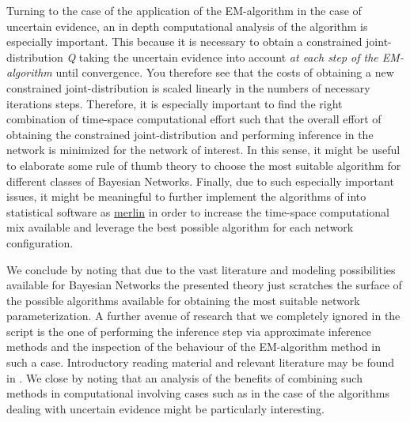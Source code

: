 \documentclass[11pt]{article}
\begin{document}
\begin{article}
Turning to the case of the application of the EM-algorithm in the
case of uncertain evidence, an in depth computational analysis of
the algorithm is especially important. This because it is necessary
to obtain a constrained joint-distribution \emph{Q} taking the uncertain
evidence into account \emph{at each step of the EM-algorithm} until
convergence. You therefore see that the costs of obtaining a new
constrained joint-distribution is scaled linearly in the numbers of
necessary iterations steps. Therefore, it is especially important
to find the right combination of time-space computational effort
such that the overall effort of obtaining the constrained
joint-distribution and performing inference in the network is
minimized for the network of interest. In this sense, it might be
useful to elaborate some rule of thumb theory to choose the most
suitable algorithm for different classes of Bayesian
Networks. Finally, due to such especially important issues, it might
be meaningful to further implement the algorithms of
\cite{Valtorta_2002} into statistical software as \href{https://github.com/radum2275/merlin}{merlin} in order to
increase the time-space computational mix available and leverage
the best possible algorithm for each network configuration.

We conclude by noting that due to the vast literature and modeling
possibilities available for Bayesian Networks the presented theory
just scratches the surface of the possible algorithms available for
obtaining the most suitable network parameterization. A further
avenue of research that we completely ignored in the script is
the one of performing the inference step via approximate inference
methods and the inspection of the behaviour of the EM-algorithm
method in such a case. Introductory reading material and relevant
literature may be found in \cite{koller2009probabilistic}. We close
by noting that an analysis of the benefits of combining such methods
in computational involving cases such as in the case of the
algorithms dealing with uncertain evidence might be particularly
interesting.

\newpage





\cleardoublepage

\end{article}
\end{document}
